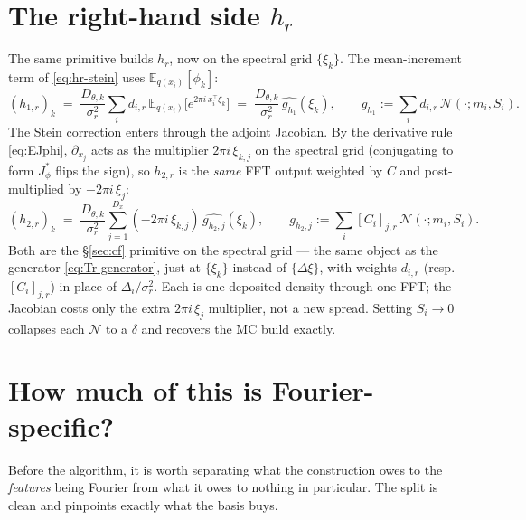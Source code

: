\documentclass[11pt]{article}
\newcommand{\Eqx}{\mathbb{E}_{q(x_i)}}
\begin{document}
\section{The right-hand side $h_r$}
\label{sec:hr}

The same primitive builds $h_r$, now on the spectral grid $\{\xi_k\}$.
The mean-increment term of \eqref{eq:hr-stein} uses $\Eqx[\phi_k]$:
\begin{equation}
(h_{1,r})_k \;=\; \frac{D_{\theta,k}}{\sigma_r^2}\sum_i d_{i,r}\,
\Eqx\!\big[e^{2\pi i\,x_i^\top\xi_k}\big]
\;=\; \frac{D_{\theta,k}}{\sigma_r^2}\,\widehat{g_{h_1}}(\xi_k),
\qquad
g_{h_1} := \sum_i d_{i,r}\,\mathcal{N}(\cdot;m_i,S_i).
\label{eq:h1-cf}
\end{equation}
The Stein correction enters through the adjoint Jacobian.  By the
derivative rule \eqref{eq:EJphi}, $\partial_{x_j}$ acts as the
multiplier $2\pi i\,\xi_{k,j}$ on the spectral grid (conjugating to form
$J_\phi^{*}$ flips the sign), so $h_{2,r}$ is the \emph{same} FFT output
weighted by $C$ and post-multiplied by $-2\pi i\,\xi_j$:
\begin{equation}
(h_{2,r})_k
\;=\; \frac{D_{\theta,k}}{\sigma_r^2}\sum_{j=1}^{D_x}
(-2\pi i\,\xi_{k,j})\,\widehat{g_{h_2,j}}(\xi_k),
\qquad
g_{h_2,j} := \sum_i [C_i]_{j,r}\,\mathcal{N}(\cdot;m_i,S_i).
\label{eq:h2-cf}
\end{equation}
Both are the \S\ref{sec:cf} primitive on the spectral grid --- the same
object as the generator \eqref{eq:Tr-generator}, just at $\{\xi_k\}$
instead of $\{\Delta\xi\}$, with weights $d_{i,r}$ (resp.\ $[C_i]_{j,r}$)
in place of $\Delta_i/\sigma_r^2$.  Each is one deposited density
through one FFT; the Jacobian costs only the extra $2\pi i\,\xi_j$
multiplier, not a new spread.  Setting $S_i\!\to\!0$ collapses each
$\mathcal{N}$ to a $\delta$ and recovers the MC build exactly.

\section{How much of this is Fourier-specific?}
\label{sec:fourier-specific}

Before the algorithm, it is worth separating what the construction owes
to the \emph{features} being Fourier from what it owes to nothing in
particular.  The split is clean and pinpoints exactly what the basis
buys.
\end{document}
